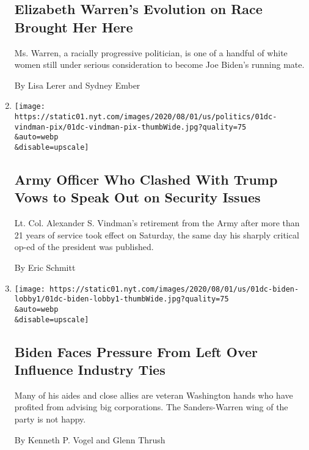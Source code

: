 \begin{enumerate}
{  \subsection{Elizabeth Warren's Evolution on Race Brought Her
  Here}\label{elizabeth-warrens-evolution-on-race-brought-her-here}}

  Ms. Warren, a racially progressive politician, is one of a handful of
  white women still under serious consideration to become Joe Biden's
  running mate.

  By Lisa Lerer and Sydney Ember
\item
  \href{/2020/08/01/us/politics/alexander-vindman-impeachment-trump.html}{}

  \texttt{[image: https://static01.nyt.com/images/2020/08/01/us/politics/01dc-vindman-pix/01dc-vindman-pix-thumbWide.jpg?quality=75\\\&auto=webp\\\&disable=upscale]}

  \hypertarget{army-officer-who-clashed-with-trump-vows-to-speak-out-on-security-issues}{%
  \subsection{Army Officer Who Clashed With Trump Vows to Speak Out on
  Security
  Issues}\label{army-officer-who-clashed-with-trump-vows-to-speak-out-on-security-issues}}

  Lt. Col. Alexander S. Vindman's retirement from the Army after more
  than 21 years of service took effect on Saturday, the same day his
  sharply critical op-ed of the president was published.

  By Eric Schmitt
\item
  \href{/2020/08/01/us/politics/biden-lobbyist-ties.html}{}

  \texttt{[image: https://static01.nyt.com/images/2020/08/01/us/01dc-biden-lobby1/01dc-biden-lobby1-thumbWide.jpg?quality=75\\\&auto=webp\\\&disable=upscale]}

  \hypertarget{biden-faces-pressure-from-left-over-influence-industry-ties}{%
  \subsection{Biden Faces Pressure From Left Over Influence Industry
  Ties}\label{biden-faces-pressure-from-left-over-influence-industry-ties}}

  Many of his aides and close allies are veteran Washington hands who
  have profited from advising big corporations. The Sanders-Warren wing
  of the party is not happy.

  By Kenneth P. Vogel and Glenn Thrush
\end{enumerate}

